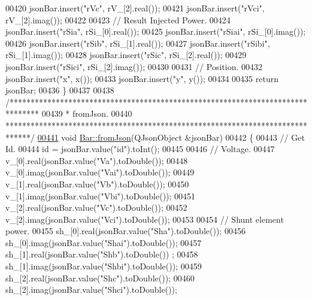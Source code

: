 \begin{DoxyCode}
00420   jsonBar.insert(\textcolor{stringliteral}{"rVc"}, rV\_[2].real());
00421   jsonBar.insert(\textcolor{stringliteral}{"rVci"}, rV\_[2].imag());
00422 
00423   \textcolor{comment}{// Result Injected Power.}
00424   jsonBar.insert(\textcolor{stringliteral}{"rSia"}, rSi\_[0].real());
00425   jsonBar.insert(\textcolor{stringliteral}{"rSiai"}, rSi\_[0].imag());
00426   jsonBar.insert(\textcolor{stringliteral}{"rSib"}, rSi\_[1].real());
00427   jsonBar.insert(\textcolor{stringliteral}{"rSibi"}, rSi\_[1].imag());
00428   jsonBar.insert(\textcolor{stringliteral}{"rSic"}, rSi\_[2].real());
00429   jsonBar.insert(\textcolor{stringliteral}{"rSici"}, rSi\_[2].imag());
00430 
00431   \textcolor{comment}{// Position.}
00432   jsonBar.insert(\textcolor{stringliteral}{"x"}, x());
00433   jsonBar.insert(\textcolor{stringliteral}{"y"}, y());
00434 
00435   \textcolor{keywordflow}{return} jsonBar;
00436 \}
00437 
00438 \textcolor{comment}{/*******************************************************************************}
00439 \textcolor{comment}{ * fromJson.}
00440 \textcolor{comment}{ ******************************************************************************/}
\hypertarget{bar_8cpp_source_l00441}{}\hyperlink{group___models_ga1df62f03dd3a066ceaf6588ba6bb6004}{00441} \textcolor{keywordtype}{void} \hyperlink{group___models_ga1df62f03dd3a066ceaf6588ba6bb6004}{Bar::fromJson}(QJsonObject &jsonBar)
00442 \{
00443   \textcolor{comment}{// Get Id.}
00444   \textcolor{keywordtype}{id} = jsonBar.value(\textcolor{stringliteral}{"id"}).toInt();
00445 
00446   \textcolor{comment}{// Voltage.}
00447   v\_[0].real(jsonBar.value(\textcolor{stringliteral}{"Va"}).toDouble());
00448   v\_[0].imag(jsonBar.value(\textcolor{stringliteral}{"Vai"}).toDouble());
00449   v\_[1].real(jsonBar.value(\textcolor{stringliteral}{"Vb"}).toDouble());
00450   v\_[1].imag(jsonBar.value(\textcolor{stringliteral}{"Vbi"}).toDouble());
00451   v\_[2].real(jsonBar.value(\textcolor{stringliteral}{"Vc"}).toDouble());
00452   v\_[2].imag(jsonBar.value(\textcolor{stringliteral}{"Vci"}).toDouble());
00453 
00454   \textcolor{comment}{// Shunt element power.}
00455   sh\_[0].real(jsonBar.value(\textcolor{stringliteral}{"Sha"}).toDouble());
00456   sh\_[0].imag(jsonBar.value(\textcolor{stringliteral}{"Shai"}).toDouble());
00457   sh\_[1].real(jsonBar.value(\textcolor{stringliteral}{"Shb"}).toDouble()) ;
00458   sh\_[1].imag(jsonBar.value(\textcolor{stringliteral}{"Shbi"}).toDouble());
00459   sh\_[2].real(jsonBar.value(\textcolor{stringliteral}{"Shc"}).toDouble());
00460   sh\_[2].imag(jsonBar.value(\textcolor{stringliteral}{"Shci"}).toDouble());

\end{DoxyCode}
